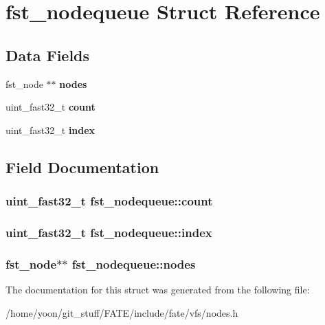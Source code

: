 \hypertarget{structfst__nodequeue}{\section{fst\-\_\-nodequeue Struct Reference}
\label{structfst__nodequeue}
}
\subsection*{Data Fields}
\begin{DoxyCompactItemize}
\item 
\hypertarget{structfst__nodequeue_af1cb03b8b021eaa8940eb109d36adc1c}{fst\-\_\-node $\ast$$\ast$ {\bfseries nodes}}\label{structfst__nodequeue_af1cb03b8b021eaa8940eb109d36adc1c}

\item 
\hypertarget{structfst__nodequeue_abd6ca75f2bd5f60387977ddc5883fdfb}{uint\-\_\-fast32\-\_\-t {\bfseries count}}\label{structfst__nodequeue_abd6ca75f2bd5f60387977ddc5883fdfb}

\item 
\hypertarget{structfst__nodequeue_a7961a7b34e82a5565cefe5447a4b7e91}{uint\-\_\-fast32\-\_\-t {\bfseries index}}\label{structfst__nodequeue_a7961a7b34e82a5565cefe5447a4b7e91}

\end{DoxyCompactItemize}


\subsection{Field Documentation}
\hypertarget{structfst__nodequeue_abd6ca75f2bd5f60387977ddc5883fdfb}{
\subsubsection[{count}]{\setlength{\rightskip}{0pt plus 5cm}uint\-\_\-fast32\-\_\-t fst\-\_\-nodequeue\-::count}}\label{structfst__nodequeue_abd6ca75f2bd5f60387977ddc5883fdfb}
\hypertarget{structfst__nodequeue_a7961a7b34e82a5565cefe5447a4b7e91}{
\subsubsection[{index}]{\setlength{\rightskip}{0pt plus 5cm}uint\-\_\-fast32\-\_\-t fst\-\_\-nodequeue\-::index}}\label{structfst__nodequeue_a7961a7b34e82a5565cefe5447a4b7e91}
\hypertarget{structfst__nodequeue_af1cb03b8b021eaa8940eb109d36adc1c}{
\subsubsection[{nodes}]{\setlength{\rightskip}{0pt plus 5cm}fst\-\_\-node$\ast$$\ast$ fst\-\_\-nodequeue\-::nodes}}\label{structfst__nodequeue_af1cb03b8b021eaa8940eb109d36adc1c}


The documentation for this struct was generated from the following file\-:\begin{DoxyCompactItemize}
\item 
/home/yoon/git\-\_\-stuff/\-F\-A\-T\-E/include/fate/vfs/nodes.\-h\end{DoxyCompactItemize}
